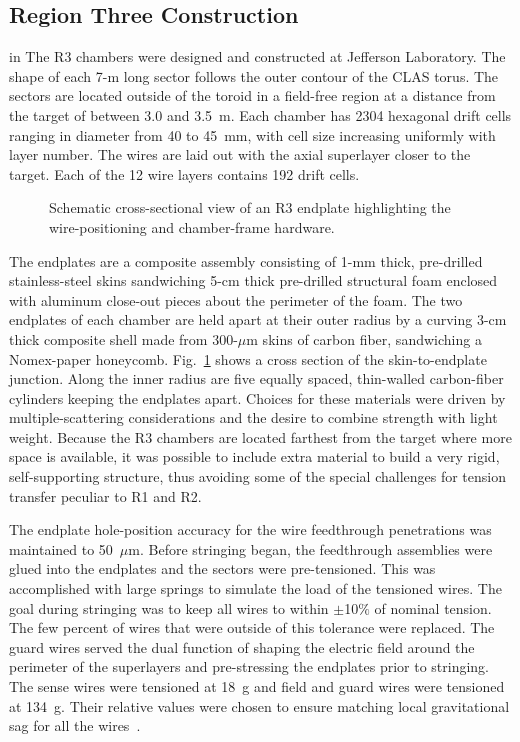 
\subsection{Region Three Construction}

 in
The R3 chambers were designed and constructed at Jefferson Laboratory.  The
shape of each 7-m long sector follows the outer contour of the CLAS torus.
The sectors are located outside of the toroid in a field-free region at a 
distance from the target of between 3.0 and 3.5~m.  Each chamber has 2304 
hexagonal drift cells ranging in diameter from 40 to 45~mm, with cell size 
increasing uniformly with layer number.  The wires are laid out with the 
axial superlayer closer to the target.  Each of the 12 wire layers contains 
192 drift cells.

\begin{figure}[htpb]
\vspace{7.9cm}
\caption{\small{Schematic cross-sectional view of an R3 endplate highlighting
the wire-positioning and chamber-frame hardware.}}
\label{r3_cut}
\end{figure}

The endplates are a composite assembly consisting of 1-mm thick, pre-drilled 
stainless-steel skins sandwiching 5-cm thick pre-drilled structural foam enclosed 
with aluminum close-out pieces about the perimeter of the foam.  The two endplates 
of each chamber are held apart at their outer radius by a curving 3-cm thick 
composite shell made from 300-$\mu$m skins of carbon fiber, sandwiching a
Nomex-paper honeycomb.  Fig.~\ref{r3_cut} shows a cross section of the 
skin-to-endplate junction. Along the inner radius are five equally spaced, 
thin-walled carbon-fiber cylinders keeping the endplates apart.  Choices for 
these materials were driven by multiple-scattering considerations and the desire 
to combine strength with light weight. Because the R3 chambers are located farthest
from the target where more space is available, it was possible to include 
extra material to build a very rigid, self-supporting structure, thus avoiding 
some of the special challenges for tension transfer peculiar to R1 and R2.

The endplate hole-position accuracy for the wire feedthrough penetrations was 
maintained to 50~$\mu$m.  Before stringing began, the feedthrough assemblies were
glued into the endplates and the sectors were pre-tensioned.  This was 
accomplished with large springs to simulate the load of the tensioned wires.  
The goal during stringing was to keep all wires to within $\pm$10$\%$ of nominal 
tension.  The few percent of wires that were outside of this tolerance were replaced.
The guard wires served the dual function of shaping the electric field around the 
perimeter of the superlayers and pre-stressing the endplates prior to 
stringing. The sense wires were tensioned at 18~g and field and guard wires were 
tensioned at 134~g.  Their relative values were chosen to ensure matching local 
gravitational sag for all the wires~\cite{chew89}.

